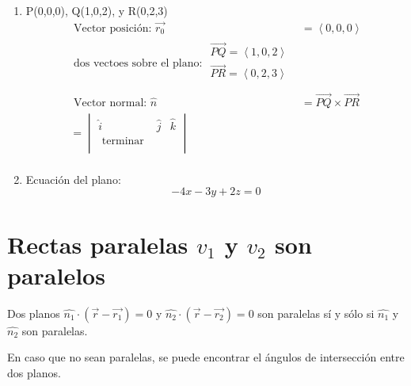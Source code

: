 \documentclass{article}
\begin{document}
\begin{enumerate}
    
    \item P(0,0,0), Q(1,0,2), y R(0,2,3)
    \begin{align*}
        \text{  Vector posición: } \vec{r_0} & = \left\langle 0,0,0 \right\rangle \\ 
          \text{ dos  vectoes sobre el plano:  } \begin{matrix*}
             \vec{PQ} = \left\langle 1,0,2 \right\rangle \\ 
             \vec{PR} = \left\langle 0,2,3 \right\rangle  \\ 
         \end{matrix*} \\ 
        \text{  Vector normal:  } \hat{n} & = \overrightarrow{PQ} \times  \overrightarrow{PR} \\ 
          = \begin{vmatrix}
             \hat{i} & \hat{j} & \hat{k} \\
              \text{  terminar  } \\
         \end{vmatrix} \\
    \end{align*}
    
    \item Ecuación del plano:
    \[
      -4x-3y+2z=0
    \]
\end{enumerate}

 \section{Rectas paralelas $v_1$ y $v_2$ son paralelos}
Dos planos $\hat{n_1} \cdot (\vec{r}- \vec{r_1})= 0$ y $\hat{n_2} \cdot ( \vec{r}- \vec{r_2}) = 0$ son paralelas sí y sólo si $\hat{n_1}$ y $\hat{n_2}$ son paralelas.

 En caso que no sean paralelas, se puede encontrar el ángulos de intersección entre dos planos.
\end{document}
